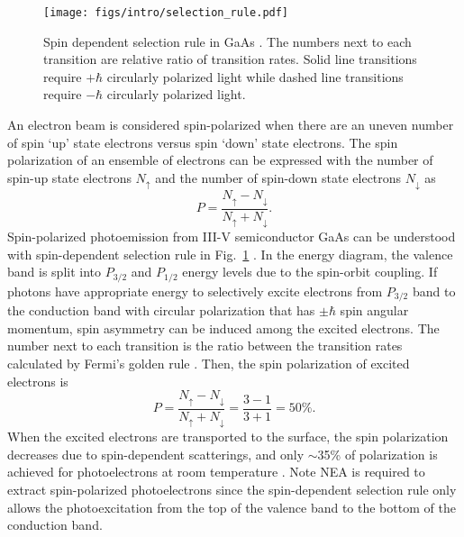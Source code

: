 \begin{figure}
\centering
\texttt{[image: figs/intro/selection\_rule.pdf]}
\caption{Spin dependent selection rule in GaAs \cite{liu2017_ComprehensiveEvaluationFactors}. The numbers next to each transition are relative ratio of transition rates. Solid line transitions require $+\hbar$ circularly polarized light while dashed line transitions require $-\hbar$ circularly polarized light.}
\label{fig_selection_rule}
\end{figure}

An electron beam is considered spin-polarized when there are an uneven number of spin `up' state electrons versus spin `down' state electrons. The spin polarization of an ensemble of electrons can be expressed with the number of spin-up state electrons $N_\uparrow$ and the number of spin-down state electrons $N_\downarrow$ as
\begin{equation}
	P = \frac{N_\uparrow - N_\downarrow}{N_\uparrow + N_\downarrow}.
\end{equation}
Spin-polarized photoemission from III-V semiconductor GaAs can be understood with spin-dependent selection rule in Fig.~\ref{fig_selection_rule} \cite{liu2017_ComprehensiveEvaluationFactors}. In the energy diagram, the valence band is split into $P_{3/2}$ and $P_{1/2}$ energy levels due to the spin-orbit coupling. If photons have appropriate energy to selectively excite electrons from $P_{3/2}$ band to the conduction band with circular polarization that has $\pm \hbar$ spin angular momentum, spin asymmetry can be induced among the excited electrons. The number next to each transition is the ratio between the transition rates calculated by Fermi's golden rule \cite{pierce1976}. Then, the spin polarization of excited electrons is
\begin{equation}
	P = \frac{N_\uparrow - N_\downarrow}{N_\uparrow + N_\downarrow} = \frac{3-1}{3+1} = 50\%.
\end{equation}
When the excited electrons are transported to the surface, the spin polarization decreases due to spin-dependent scatterings, and only $\sim$35\% of polarization is achieved for photoelectrons at room temperature \cite{liu2017_ComprehensiveEvaluationFactors}.
Note NEA is required to extract spin-polarized photoelectrons since the spin-dependent selection rule only allows the photoexcitation from the top of the valence band to the bottom of the conduction band.

